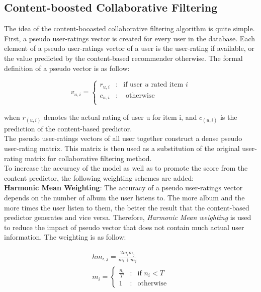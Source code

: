 \subsection{Content-boosted Collaborative Filtering}
The idea of the content-booasted collaborative filtering algorithm is quite simple. First, a pseudo user-ratings vector is created for every user in the database. Each element of a pseudo user-ratings vector of a user is the user-rating if available, or the value predicted by the content-based recommender otherwise. The formal definition of a pseudo vector is as follow:

\begin{displaymath}
v_{u,i} = \left\{ \begin{array}{lcl} r_{u,i} & \mbox{:} & \text{if user }u \text{ rated item } i \\
c_{u,i} & \mbox{:} & \text{ otherwise} \\
\end{array} \right.
\end{displaymath}

\noindent when \( r_{(u,i)} \) denotes the actual rating of user u for item i, and \(c_{(u,i)} \) is the prediction of the content-based predictor. \\

\noindent The pseudo user-ratings vectors of all user together construct a dense pseudo user-rating matrix. This matrix is then used as a substitution of the original user-rating matrix for collaborative filtering method. \\

\noindent To increase the accuracy of the model as well as to promote the score from the content predictor,
the following weighting schemes are added:\\

\noindent \textbf{Harmonic Mean Weighting}: The accuracy of a pseudo user-ratings vector depends on the number of album the user listens to. The more album and the more times the user listen to them, the better the result that the content-based predictor generates and vice versa. Therefore, \textit{Harmonic Mean weighting} is used to reduce the impact of pseudo vector that does not contain much actual user information. The weighting is as follow:

\begin{gather*}
hm_{i,j} = \frac{2m_im_j}{m_i + m_j} \\
m_i = \left\{ \begin{array}{lcl} 
\frac{n_i}{T} & \mbox{:} & \text{if } n_i < T \\
1 & \mbox{:} & \text{otherwise} 
\end{array}
\right. 
\end{gather*} 

